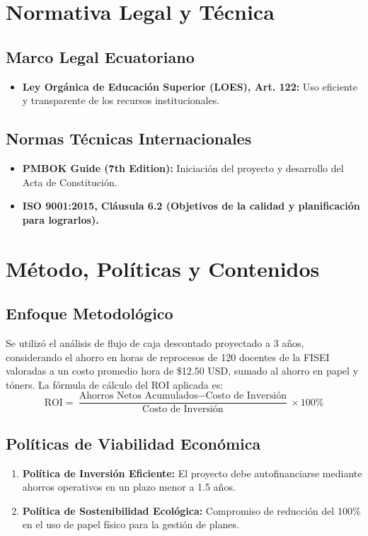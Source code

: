 \documentclass[12pt,a4paper]{article}
\begin{document}
\section{Normativa Legal y Técnica}
\subsection{Marco Legal Ecuatoriano}
\begin{itemize}[leftmargin=1.5em, itemsep=2pt]
    \item \textbf{Ley Orgánica de Educación Superior (LOES), Art. 122:} Uso eficiente y transparente de los recursos institucionales.
\end{itemize}
\subsection{Normas Técnicas Internacionales}
\begin{itemize}[leftmargin=1.5em, itemsep=2pt]
    \item \textbf{PMBOK Guide (7th Edition):} Iniciación del proyecto y desarrollo del Acta de Constitución.
    \item \textbf{ISO 9001:2015, Cláusula 6.2 (Objetivos de la calidad y planificación para lograrlos).}
\end{itemize}

\section{Método, Políticas y Contenidos}
\subsection{Enfoque Metodológico}
Se utilizó el análisis de flujo de caja descontado proyectado a 3 años, considerando el ahorro en horas de reprocesos de 120 docentes de la FISEI valoradas a un costo promedio hora de \$12.50 USD, sumado al ahorro en papel y tóners. La fórmula de cálculo del ROI aplicada es:
\begin{equation}
    \text{ROI} = \frac{\text{Ahorros Netos Acumulados} - \text{Costo de Inversión}}{\text{Costo de Inversión}} \times 100\%
\end{equation}

\subsection{Políticas de Viabilidad Económica}
\begin{enumerate}[leftmargin=1.5em, itemsep=2pt]
    \item \textbf{Política de Inversión Eficiente:} El proyecto debe autofinanciarse mediante ahorros operativos en un plazo menor a 1.5 años.
    \item \textbf{Política de Sostenibilidad Ecológica:} Compromiso de reducción del 100\% en el uso de papel físico para la gestión de planes.
\end{enumerate}
\end{document}
